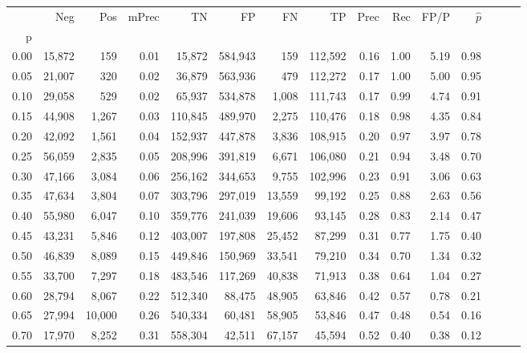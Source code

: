 \begin{tabular}{rrrrrrrrrrrrrrr}
\toprule
{} &     Neg &     Pos & mPrec &       TN &       FP &       FN &       TP &  Prec &   Rec &  FP/P & $\hat{p}$ \\
p    &         &         &       &          &          &          &          &       &       &       &           \\
\midrule
0.00 &  15,872 &     159 &  0.01 &   15,872 &  584,943 &      159 &  112,592 &  0.16 &  1.00 &  5.19 &      0.98 \\
0.05 &  21,007 &     320 &  0.02 &   36,879 &  563,936 &      479 &  112,272 &  0.17 &  1.00 &  5.00 &      0.95 \\
0.10 &  29,058 &     529 &  0.02 &   65,937 &  534,878 &    1,008 &  111,743 &  0.17 &  0.99 &  4.74 &      0.91 \\
0.15 &  44,908 &   1,267 &  0.03 &  110,845 &  489,970 &    2,275 &  110,476 &  0.18 &  0.98 &  4.35 &      0.84 \\
0.20 &  42,092 &   1,561 &  0.04 &  152,937 &  447,878 &    3,836 &  108,915 &  0.20 &  0.97 &  3.97 &      0.78 \\
0.25 &  56,059 &   2,835 &  0.05 &  208,996 &  391,819 &    6,671 &  106,080 &  0.21 &  0.94 &  3.48 &      0.70 \\
0.30 &  47,166 &   3,084 &  0.06 &  256,162 &  344,653 &    9,755 &  102,996 &  0.23 &  0.91 &  3.06 &      0.63 \\
0.35 &  47,634 &   3,804 &  0.07 &  303,796 &  297,019 &   13,559 &   99,192 &  0.25 &  0.88 &  2.63 &      0.56 \\
0.40 &  55,980 &   6,047 &  0.10 &  359,776 &  241,039 &   19,606 &   93,145 &  0.28 &  0.83 &  2.14 &      0.47 \\
0.45 &  43,231 &   5,846 &  0.12 &  403,007 &  197,808 &   25,452 &   87,299 &  0.31 &  0.77 &  1.75 &      0.40 \\
0.50 &  46,839 &   8,089 &  0.15 &  449,846 &  150,969 &   33,541 &   79,210 &  0.34 &  0.70 &  1.34 &      0.32 \\
0.55 &  33,700 &   7,297 &  0.18 &  483,546 &  117,269 &   40,838 &   71,913 &  0.38 &  0.64 &  1.04 &      0.27 \\
0.60 &  28,794 &   8,067 &  0.22 &  512,340 &   88,475 &   48,905 &   63,846 &  0.42 &  0.57 &  0.78 &      0.21 \\
0.65 &  27,994 &  10,000 &  0.26 &  540,334 &   60,481 &   58,905 &   53,846 &  0.47 &  0.48 &  0.54 &      0.16 \\
0.70 &  17,970 &   8,252 &  0.31 &  558,304 &   42,511 &   67,157 &   45,594 &  0.52 &  0.40 &  0.38 &      0.12 \\

\end{tabular}
